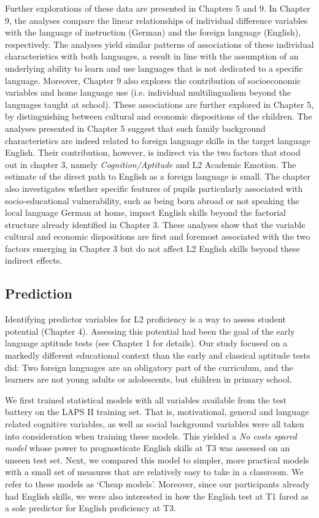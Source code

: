 \documentclass[output=paper]{langsci/langscibook}
\begin{document}
Further explorations of these data are presented in Chapters 5 and 9. In Chapter 9, the analyses compare the linear relationships of individual difference variables with the language of instruction (German) and the foreign language (English), respectively. The analyses yield similar patterns of associations of these individual characteristics with both languages, a result in line with the assumption of an underlying ability to learn and use languages that is not dedicated to a specific language. Moreover, Chapter 9 also explores the contribution of socioeconomic variables and home language use (i.e. individual multilingualism beyond the languages taught at school). These associations are further explored in Chapter 5, by distinguishing between cultural and economic dispositions of the children. The analyses presented in Chapter 5 suggest that such family background characteristics are indeed related to foreign language skills in the target language English. Their contribution, however, is indirect via the two factors that stood out in chapter 3, namely \textit{Cognition/Aptitude} and L2 Academic Emotion. The estimate of the direct path to English as a foreign language is small. The chapter also investigates whether specific features of pupils particularly associated with socio-educational vulnerability, such as being born abroad or not speaking the local language German at home, impact English skills beyond the factorial structure already identified in Chapter 3. These analyses show that the variable cultural and economic dispositions are first and foremost associated with the two factors emerging in Chapter 3 but do not affect L2 English skills beyond these indirect effects.

\subsection{Prediction}

Identifying predictor variables for L2 proficiency is a way to assess student potential (Chapter 4). Assessing this potential had been the goal of the early language aptitude tests (see Chapter 1 for details). Our study focused on a markedly different educational context than the early and classical aptitude tests did: Two foreign languages are an obligatory part of the curriculum, and the learners are not young adults or adolescents, but children in primary school.

We first trained statistical models with all variables available from the test battery on the LAPS II training set. That is, motivational, general and language related cognitive variables, as well as social background variables were all taken into consideration when training these models. This yielded a \textit{No costs spared model} whose power to prognosticate English skills at T3 was assessed on an unseen test set. Next, we compared this model to simpler, more practical models with a small set of measures that are relatively easy to take in a classroom. We refer to these models as ‘Cheap models’. Moreover, since our participants already had English skills, we were also interested in how the English test at T1 fared as a sole predictor for English proficiency at T3.  
\end{document}
